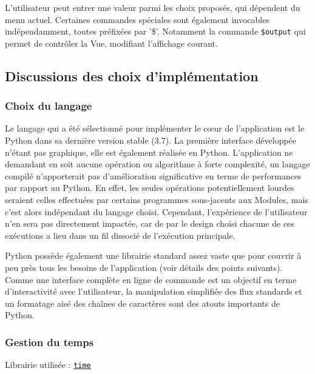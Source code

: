 \documentclass[]{article}
\begin{document}
\par L'utilisateur peut entrer une valeur parmi les choix proposés, qui dépendent du menu actuel. Certaines commandes spéciales sont également invocables indépendamment, toutes préfixées par '\$'. Notamment la commande \texttt{\$output} qui permet de contrôler la Vue, modifiant l'affichage courant.


\newpage

\subsection{Discussions des choix d'implémentation}

\subsubsection{Choix du langage}

Le langage qui a été sélectionné pour implémenter le cœur de l'application est le Python dans sa dernière version stable (3.7). La première interface développée n'étant pas graphique, elle est également réalisée en Python. L'application ne demandant en soit aucune opération ou algorithme à forte complexité, un langage compilé n'apporterait pas d'amélioration significative en terme de performances par rapport au Python. En effet, les seules opérations potentiellement lourdes seraient celles effectuées par certains programmes sous-jacents aux Modules, mais c'est alors indépendant du langage choisi. Cependant, l'expérience de l'utilisateur n'en sera pas directement impactée, car de par le design choisi chacune de ces exécutions a lieu dans un fil dissocié de l'exécution principale.\\

\par Python possède également une librairie standard assez vaste que pour couvrir à peu près tous les besoins de l'application (voir détails des points suivants). Comme une interface complète en ligne de commande est un objectif en terme d'interactivité avec l'utilisateur, la manipulation simplifiée des flux standards et un formatage aisé des chaînes de caractères sont des atouts importants de Python.

\subsubsection{Gestion du temps}

\noindent Librairie utilisée : \href{https://docs.python.org/3/library/time.html}{\texttt{time}}\\
\end{document}
